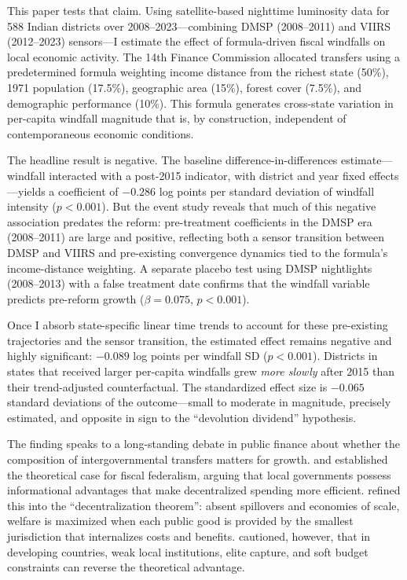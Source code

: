 \documentclass[12pt]{article}
\begin{document}
This paper tests that claim. Using satellite-based nighttime luminosity data for 588 Indian districts over 2008--2023---combining DMSP (2008--2011) and VIIRS (2012--2023) sensors---I estimate the effect of formula-driven fiscal windfalls on local economic activity. The 14th Finance Commission allocated transfers using a predetermined formula weighting income distance from the richest state (50\%), 1971 population (17.5\%), geographic area (15\%), forest cover (7.5\%), and demographic performance (10\%). This formula generates cross-state variation in per-capita windfall magnitude that is, by construction, independent of contemporaneous economic conditions.

The headline result is negative. The baseline difference-in-differences estimate---windfall interacted with a post-2015 indicator, with district and year fixed effects---yields a coefficient of $-0.286$ log points per standard deviation of windfall intensity ($p < 0.001$). But the event study reveals that much of this negative association predates the reform: pre-treatment coefficients in the DMSP era (2008--2011) are large and positive, reflecting both a sensor transition between DMSP and VIIRS and pre-existing convergence dynamics tied to the formula's income-distance weighting. A separate placebo test using DMSP nightlights (2008--2013) with a false treatment date confirms that the windfall variable predicts pre-reform growth ($\beta = 0.075$, $p < 0.001$).

Once I absorb state-specific linear time trends to account for these pre-existing trajectories and the sensor transition, the estimated effect remains negative and highly significant: $-0.089$ log points per windfall SD ($p < 0.001$). Districts in states that received larger per-capita windfalls grew \emph{more slowly} after 2015 than their trend-adjusted counterfactual. The standardized effect size is $-0.065$ standard deviations of the outcome---small to moderate in magnitude, precisely estimated, and opposite in sign to the ``devolution dividend'' hypothesis.

The finding speaks to a long-standing debate in public finance about whether the composition of intergovernmental transfers matters for growth. \citet{oates1972fiscal} and \citet{musgrave1959theory} established the theoretical case for fiscal federalism, arguing that local governments possess informational advantages that make decentralized spending more efficient. \citet{oates1999essay} refined this into the ``decentralization theorem'': absent spillovers and economies of scale, welfare is maximized when each public good is provided by the smallest jurisdiction that internalizes costs and benefits. \citet{bardhan2002decentralization} cautioned, however, that in developing countries, weak local institutions, elite capture, and soft budget constraints can reverse the theoretical advantage.
\end{document}
